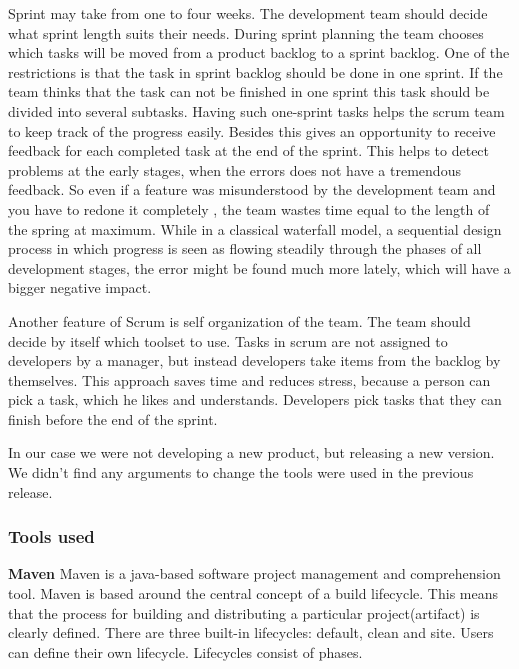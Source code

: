 \documentclass{article}
\begin{document}
  Sprint may take from one to four weeks. The development team should decide
  what sprint length suits their needs. During sprint planning the team chooses
  which tasks will be moved from a product backlog to a sprint backlog.
  One of the restrictions is that the task in sprint backlog should be done in one sprint.
  If the team thinks that the task can not be finished in one sprint this task
  should be divided into several subtasks. 
  Having such one-sprint tasks helps the scrum team to keep track of the
  progress easily. Besides this gives an opportunity to receive feedback for each completed task at the end
  of the sprint. This helps to detect problems at the early stages, when
  the errors does not have a tremendous feedback. So even if a feature was misunderstood by the development team
  and you have to redone it completely , the team wastes time equal to the
  length of the spring at maximum. While in a classical waterfall model, a sequential design process in which
  progress is seen as flowing steadily through the phases of all development stages, 
  the error might be found much more lately, which will have a bigger negative impact.

  Another feature of Scrum is self organization of the team. The team should
  decide by itself which toolset to use. Tasks in scrum are not assigned to developers by a manager,
  but instead developers take items from the backlog by themselves.
  This approach saves time and reduces stress, because a person can pick a task,
  which he likes and understands. Developers pick tasks that they
  can finish before the end of the sprint.

  In our case we were not developing a new product, but releasing a new version.
  We didn’t find any arguments to change the tools were used in the previous release.

  \subsubsection {Tools used}
  
  \textbf{Maven}
  Maven is a java-based software project management and comprehension tool.
  Maven is based around the central concept of a build lifecycle. This means that the process for building 
  and distributing a particular project(artifact) is clearly defined. There are three built-in lifecycles:
  default, clean and site. Users can define their own lifecycle. Lifecycles consist of phases.
   
\end{document}
